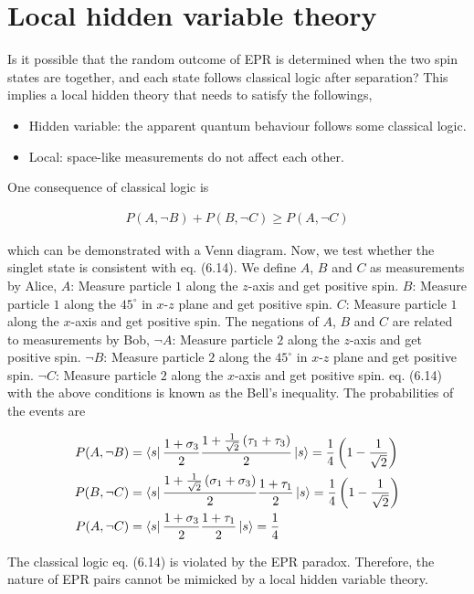 \documentclass[12pt]{book} %
\numberwithin{equation}{chapter}
\def\s{\sigma}
\def\t{\tau}
\begin{document}
\section{Local hidden variable theory}
Is it possible that the random outcome of EPR is determined when the two spin states are together, and each state follows classical logic after separation? This implies a local hidden theory that needs to satisfy the followings,
\begin{itembox}
\begin{itemize}
\item Hidden variable: the apparent quantum behaviour follows some classical logic.
\item Local: space-like measurements do not affect each other.
\end{itemize}
\end{itembox}
One consequence of classical logic is
\begin{eqnbox}
\begin{align}
P(A, \neg B)+P(B, \neg C)\geq P(A, \neg C)
\end{align}
\end{eqnbox}
which can be demonstrated with a Venn diagram. Now, we test whether the singlet state is consistent with eq. (6.14). We define $A$, $B$ and $C$ as measurements by Alice,\bigskip\newline
$A$: Measure particle $1$ along the $z$-axis and get positive spin.\bigskip\newline
$B$: Measure particle $1$ along the $45^\circ$ in $x$-$z$ plane and get positive spin.\bigskip\newline
$C$: Measure particle $1$ along the $x$-axis and get positive spin.\bigskip\newline
The negations of $A$, $B$ and $C$ are related to measurements by Bob,\bigskip\newline
$\neg A$: Measure particle $2$ along the $z$-axis and get positive spin.\bigskip\newline
$\neg B$: Measure particle $2$ along the $45^\circ$ in $x$-$z$ plane and get positive spin.\bigskip\newline
$\neg C$: Measure particle $2$ along the $x$-axis and get positive spin.\bigskip\newline
eq. (6.14) with the above conditions is known as the Bell's inequality.  The probabilities of the events are
\begin{eqnbox}
\begin{align}
P(A, \neg B)&=\bra{s}\frac{1+\s_{3}}{2}\frac{1+\frac{1}{\sqrt{2}}\left(\t_{1}+\t_{3}\right)}{2}\ket{s}=\frac{1}{4}\left(1-\frac{1}{\sqrt{2}}\right)\nonumber\\
P(B, \neg C)&=\bra{s}\frac{1+\frac{1}{\sqrt{2}}\left(\s_{1}+\s_{3}\right)}{2}\frac{1+\t_{1}}{2}\ket{s}=\frac{1}{4}\left(1-\frac{1}{\sqrt{2}}\right)\nonumber\\
P(A, \neg C)&=\bra{s}\frac{1+\s_{3}}{2}\frac{1+\t_{1}}{2}\ket{s}=\frac{1}{4}
\end{align}
\end{eqnbox}
The classical logic eq. (6.14) is violated by the EPR paradox. Therefore, the nature of EPR pairs cannot be mimicked by a local hidden variable theory.
\end{document}
